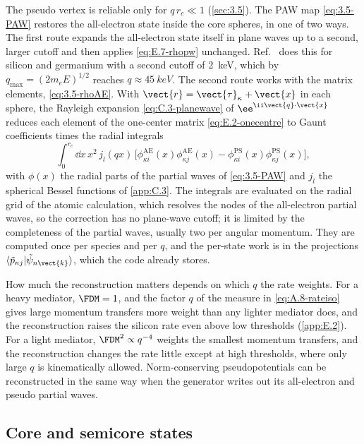 The pseudo vertex is reliable only for $q\,r_c \ll 1$ (\cref{sec:3.5}). The PAW map \cref{eq:3.5-PAW} restores the all-electron state inside the core spheres, in one of two ways. The first route expands the all-electron state itself in plane waves up to a second, larger cutoff and then applies \cref{eq:E.7-rhopw} unchanged. Ref.~\cite[Sect.~2.1.1]{griffin2021extended} does this for silicon and germanium with a second cutoff of \SI{2}{keV}, which by $q_{\mathrm{max}} = (2m_eE)^{1/2}$ reaches $q \approx \SI{45}{keV}$. The second route works with the matrix elements, \cref{eq:3.5-rhoAE}. With $\vect{r} = \vect{\tau}_\kappa + \vect{x}$ in each sphere, the Rayleigh expansion \cref{eq:C.3-planewave} of $\ee^{\ii\vect{q}\cdot\vect{x}}$ reduces each element of the one-center matrix \cref{eq:E.2-onecentre} to Gaunt coefficients times the radial integrals
\begin{equation}
  \int_0^{r_c}\dd x\,x^2\,j_l(qx)\,\bigl[\phi^{\mathrm{AE}}_{\kappa i}(x)\phi^{\mathrm{AE}}_{\kappa j}(x) - \phi^{\mathrm{PS}}_{\kappa i}(x)\phi^{\mathrm{PS}}_{\kappa j}(x)\bigr] ,
  \label{eq:E.7-radial}
\end{equation}
with $\phi(x)$ the radial parts of the partial waves of \cref{eq:3.5-PAW} and $j_l$ the spherical Bessel functions of \cref{app:C.3}. The integrals are evaluated on the radial grid of the atomic calculation, which resolves the nodes of the all-electron partial waves, so the correction has no plane-wave cutoff; it is limited by the completeness of the partial waves, usually two per angular momentum. They are computed once per species and per $q$, and the per-state work is in the projections $\langle\tilde p_{\kappa j}|\tilde\psi_{n\vect{k}}\rangle$, which the code already stores.

How much the reconstruction matters depends on which $q$ the rate weights. For a heavy mediator, $\FDM = 1$, and the factor $q$ of the measure in \cref{eq:A.8-rateiso} gives large momentum transfers more weight than any lighter mediator does, and the reconstruction raises the silicon rate even above low thresholds (\cref{app:E.2}). For a light mediator, $\FDM^2 \propto q^{-4}$ weights the smallest momentum transfers, and the reconstruction changes the rate little except at high thresholds, where only large $q$ is kinematically allowed. Norm-conserving pseudopotentials can be reconstructed in the same way when the generator writes out its all-electron and pseudo partial waves.

\subsection{Core and semicore states}

